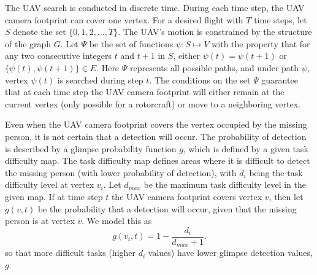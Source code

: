 \documentclass[journal]{IEEEtran}
\begin{document}
The UAV search is conducted in discrete time. During each time step, the UAV camera footprint can cover one vertex. For a desired flight with $T$ time steps, let $S$ denote the set $\{0,1,2,...,T\}$. The UAV's motion is constrained by the structure of the graph $G$. Let $\Psi$ be the set of functions $\psi:S \mapsto V$ with the property that for any two consecutive integers $t$ and $t+1$ in $S$, either $\psi(t)=\psi(t+1)$ or $\{\psi(t),\psi(t+1)\}\in E$. Here $\Psi$ represents all possible paths, and under path $\psi$, vertex $\psi(t)$ is searched during step $t$. The conditions on the set $\Psi$ guarantee that at each time step the UAV camera footprint will either remain at the current vertex (only possible for a rotorcraft) or move to a neighboring vertex.

Even when the UAV camera footprint covers the vertex occupied by the missing person, it is not certain that a detection will occur. The probability of detection is described by a glimpse probability function $g$, which is defined by a given task difficulty map. The task difficulty map defines areas where it is difficult to detect the missing person (with lower probability of detection), with $d_i$ being the task difficulty level at vertex $v_i$. Let $d_{max}$ be the maximum task difficulty level in the given map. If at time step $t$ the UAV camera footprint covers vertex $v$, then let $g(v,t)$ be the probability that a detection will occur, given that the missing person is at vertex $v$. We model this as
\begin{equation}
g(v_i,t) = 1 - \frac{d_i}{d_{max}+1}.
\label{g}
\end{equation}
so that more difficult tasks (higher $d_i$ values) have lower glimpse detection values, $g$.
\end{document}
